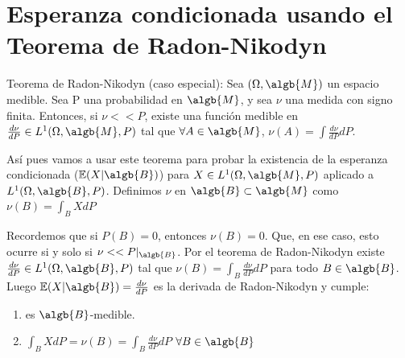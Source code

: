 \documentclass{apuntes}
\begin{document}
\section{Esperanza condicionada usando el Teorema de Radon-Nikodyn}
Teorema de Radon-Nikodyn (caso especial): Sea $(\Omega, \algb{M})$ un espacio medible. Sea P una probabilidad en $\algb{M}$, y sea $\nu$ una medida con signo finita. Entonces, si $\nu<<P$, existe una función medible en $\frac{d\nu}{dP} \in L^1(\Omega, \algb{M}, P)$ tal que $\forall A \in \algb{M}$, $\nu(A)=\int \frac{
d\nu}{dP} dP$.

Así pues vamos a usar este teorema para probar la existencia de la esperanza condicionada ($\mathbb{E}(X|\algb{B})$) para $X \in L^1(\Omega, \algb{M}, P)$ aplicado a $L^1(\Omega, \algb{B}, P)$. Definimos $\nu$ en $\algb{B} \subset \algb{M}$ como $\nu(B)=\int_B XdP$

Recordemos que si $P(B)=0$, entonces $\nu(B)=0$. Que, en ese caso, esto ocurre si y solo si $\nu << P|_{\algb{B}}$. Por el teorema de Radon-Nikodyn existe $\frac{d\nu}{dP} \in L^1(\Omega, \algb{B}, P)$ tal que $\nu(B)=\int_B \frac{d\nu}{dP} dP$ para todo $B \in \algb{B}$. Luego $\mathbb{E}(X|\algb{B})=\frac{d\nu}{dP}$ es la derivada de Radon-Nikodyn y cumple:
\begin{enumerate}
\item es $\algb{B}$-medible.

\item $\int_B X dP =\nu(B) = \int_B \frac{d\nu}{dP} dP$  $\forall B \in \algb{B}$
\end{enumerate}
\end{document}
